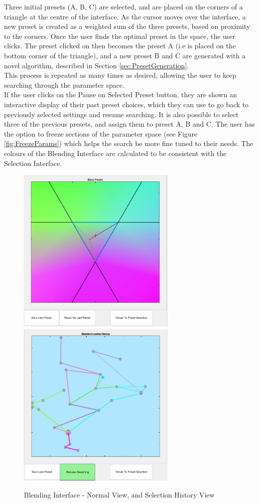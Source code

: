 \documentclass[11pt, oneside]{report}   	%
\begin{document}
Three initial presets (A, B, C) are selected, and are placed on the corners of a triangle at the centre of the interface. As the cursor moves over the interface, a new preset is created as a weighted sum of the three presets, based on proximity to the corners. Once the user finds the optimal preset in the space, the user clicks. The preset clicked on then becomes the preset A (i.e is placed on the bottom corner of the triangle), and a new preset B and C are generated with a novel algorithm, described in Section \ref{sec:PresetGeneration}. \\
This process is repeated as many times as desired, allowing the user to keep searching through the parameter space.\\
If the user clicks on the Pause on Selected Preset button, they are shown an interactive display of their past preset choices, which they can use to go back to previously selected settings and resume searching. It is also possible to select three of the previous presets, and assign them to preset A, B and C.
The user has the option to freeze sections of the parameter space (see Figure \ref{fig:FreezeParams}) which helps the search be more fine tuned to their needs.
The colours of the Blending Interface are calculated to be consistent with the Selection Interface.
\begin{figure}[h] 
	\centering
	\hspace*{-0.2cm}
	\includegraphics[width = 3.0in]{BlendingInterface1.png}
	\hspace*{0.2cm}
	\includegraphics[width = 3.0in]{BlendingInterface2.png}
	\caption{Blending Interface - Normal View, and Selection History View}
	\label{fig:BlendingInterface}
\end{figure}
\end{document}
